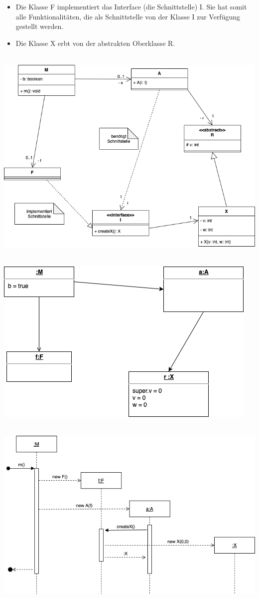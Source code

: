 \begin{aufgabe}%
  \begin{teile}
    \item
    \begin{itemize}
      \item Die Klasse F implementiert das Interface (die Schnittstelle) I. Sie hat somit alle Funktionalitäten, die als Schnittstelle von der Klasse I zur Verfügung gestellt werden.
      \item Die Klasse X erbt von der abstrakten Oberklasse R.
    \end{itemize}
    \item \mbox{}\\ \includegraphics[width = 0.9\linewidth]{F18_66116_T2_TA2_A1b.png}
    \item \mbox{}\\ \includegraphics[width = 0.7\linewidth]{F18_66116_T2_TA2_A1c.png}
    \item \mbox{}\\ \includegraphics[width = \linewidth]{F18_66116_T2_TA2_A1d.png}

\end{teile}
\end{aufgabe}
